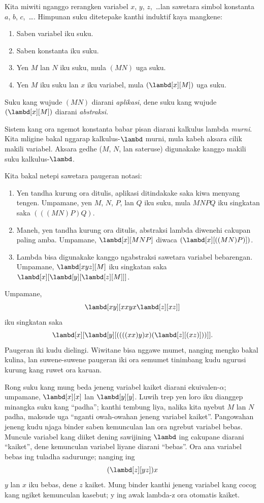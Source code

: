 \documentclass[../../../include/open-logic-section]{subfiles}
\begin{document}

Kita miwiti nganggo rerangken variabel $x$, $y$,
$z$,~\dots lan sawetara simbol konstanta $a$, $b$,
$c$,~\dots. Himpunan suku ditetepake kanthi induktif
kaya mangkene:
\begin{enumerate}
\item Saben variabel iku suku.
\item Saben konstanta iku suku.
\item Yen $M$ lan $N$ iku suku, mula $(MN)$ uga suku.
\item Yen $M$ iku suku lan $x$ iku variabel, mula
  $(\lambd[x][M])$ uga suku.
\end{enumerate}
Suku kang wujude $(MN)$ diarani \emph{aplikasi},
dene suku kang wujude $(\lambd[x][M])$
diarani \emph{abstraksi}.

Sistem kang ora ngemot konstanta babar pisan diarani
kalkulus lambda \emph{murni}. Kita mligine bakal
nggarap kalkulus-$\lambd$ murni, mula kabeh aksara
cilik makili variabel. Aksara gedhe ($M$, $N$,
lan sateruse) digunakake kanggo makili suku
kalkulus-$\lambd$.

Kita bakal netepi sawetara paugeran notasi:

\begin{conv}
\begin{enumerate}
\item Yen tandha kurung ora ditulis, aplikasi
  ditindakake saka kiwa menyang tengen.
  Umpamane, yen $M$, $N$, $P$, lan $Q$ iku
  suku, mula $MNPQ$ iku singkatan saka
  $(((MN)P)Q)$.
\item Maneh, yen tandha kurung ora ditulis,
  abstraksi lambda diwenehi cakupan paling
  amba. Umpamane, $\lambd[x][MNP]$
  diwaca $(\lambd[x][((MN)P)])$.
\item Lambda bisa digunakake kanggo
  ngabstraksi sawetara variabel bebarengan.
  Umpamane, $\lambd[xyz][M]$ iku
  singkatan saka
  $\lambd[x][\lambd[y][\lambd[z][M]]]$.
\end{enumerate}
\end{conv}

Umpamane,
\[
\lambd[xy][xxyx \lambd[z][xz]]
\]
iku singkatan saka
\[
\lambd[x][\lambd[y][((((xx)y)x)(\lambd[z][(xz)]))]].
\]
Paugeran iki kudu dielingi. Wiwitane bisa nggawe
mumet, nanging mengko bakal kulina,
lan suwene-suwene paugeran iki ora semumet
tinimbang kudu ngurusi kurung kang ruwet
ora karuan.

Rong suku kang mung beda jeneng variabel kaiket
diarani ekuivalen-$\alpha$; umpamane,
$\lambd[x][x]$ lan $\lambd[y][y]$.
Luwih trep yen loro iku dianggep minangka suku
kang ``padha''; kanthi tembung liya,
nalika kita nyebut $M$ lan $N$ padha, maksude
uga ``nganti owah-owahan jeneng variabel
kaiket''. Pangowahan jeneng kudu njaga binder saben kemunculan lan ora ngrebut variabel bebas. Muncule variabel kang diiket
dening sawijining $\lambd$ ing cakupane diarani
``kaiket'', dene kemunculan variabel liyane
diarani ``bebas''.
Ora ana variabel bebas ing tuladha sadurunge;
nanging ing
\[
(\lambd[z][yz])x
\]
$y$ lan $x$ iku bebas, dene $z$ kaiket. Mung binder kanthi jeneng variabel kang cocog kang ngiket kemunculan kasebut; y ing awak lambda-z ora otomatis kaiket.
\end{document}

